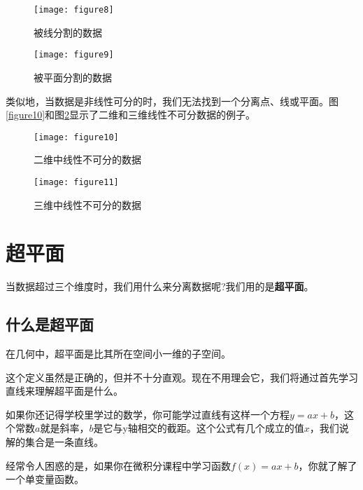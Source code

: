 \begin{figure}[ht]
    \begin{minipage}{.5\linewidth}
        \centering
        \texttt{[image: figure8]}
        \caption{被线分割的数据}
        \label{figure8}
    \end{minipage}
    \begin{minipage}{.5\linewidth}
        \centering
        \texttt{[image: figure9]}
        \caption{被平面分割的数据}
        \label{figure9}
    \end{minipage}
\end{figure}


类似地，当数据是非线性可分的时，我们无法找到一个分离点、线或平面。图\ref{figure10}和图\ref{figure11}显示了二维和三维线性不可分数据的例子。


\begin{figure}[ht]
    \begin{minipage}{.5\linewidth}
        \centering
        \texttt{[image: figure10]}
        \caption{二维中线性不可分的数据}
        \label{figure10}
    \end{minipage}
    \begin{minipage}{.5\linewidth}
        \centering
        \texttt{[image: figure11]}
        \caption{三维中线性不可分的数据}
        \label{figure11}
    \end{minipage}
\end{figure}


\section{超平面}

当数据超过三个维度时，我们用什么来分离数据呢?我们用的是\textbf{超平面}。

\subsection{什么是超平面}

在几何中，超平面是比其所在空间小一维的子空间。

这个定义虽然是正确的，但并不十分直观。现在不用理会它，我们将通过首先学习直线来理解超平面是什么。

如果你还记得学校里学过的数学，你可能学过直线有这样一个方程$y=ax+b$，这个常数$a$就是斜率，$b$是它与y轴相交的截距。这个公式有几个成立的值$x$，我们说解的集合是一条直线。

经常令人困惑的是，如果你在微积分课程中学习函数$f(x) = ax+b$，你就了解了一个单变量函数。

